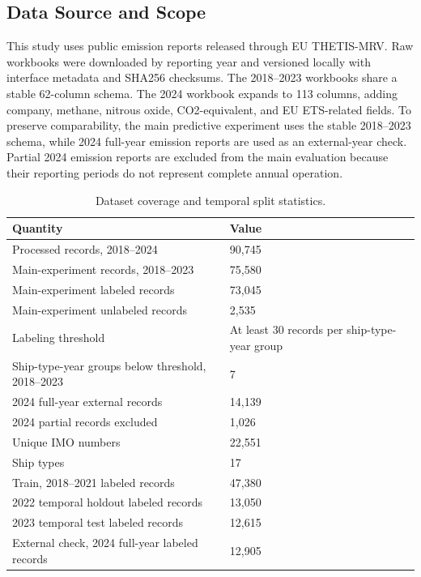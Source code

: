 \documentclass[preprints,article,submit,pdftex,oneauthor]{Definitions/mdpi}
\begin{document}
\subsection{Data Source and Scope}

This study uses public emission reports released through EU THETIS-MRV. Raw workbooks were downloaded by reporting year and versioned locally with interface metadata and SHA256 checksums. The 2018--2023 workbooks share a stable 62-column schema. The 2024 workbook expands to 113 columns, adding company, methane, nitrous oxide, CO2-equivalent, and EU ETS-related fields. To preserve comparability, the main predictive experiment uses the stable 2018--2023 schema, while 2024 full-year emission reports are used as an external-year check. Partial 2024 emission reports are excluded from the main evaluation because their reporting periods do not represent complete annual operation.

\begin{table}[H]
\caption{Dataset coverage and temporal split statistics.\label{tab:data}}
\begin{tabularx}{\textwidth}{LX}
\toprule
\textbf{Quantity} & \textbf{Value}\\
\midrule
Processed records, 2018--2024 & 90,745\\
Main-experiment records, 2018--2023 & 75,580\\
Main-experiment labeled records & 73,045\\
Main-experiment unlabeled records & 2,535\\
Labeling threshold & At least 30 records per ship-type-year group\\
Ship-type-year groups below threshold, 2018--2023 & 7\\
2024 full-year external records & 14,139\\
2024 partial records excluded & 1,026\\
Unique IMO numbers & 22,551\\
Ship types & 17\\
Train, 2018--2021 labeled records & 47,380\\
2022 temporal holdout labeled records & 13,050\\
2023 temporal test labeled records & 12,615\\
External check, 2024 full-year labeled records & 12,905\\
\bottomrule
\end{tabularx}
\end{table}
\end{document}
